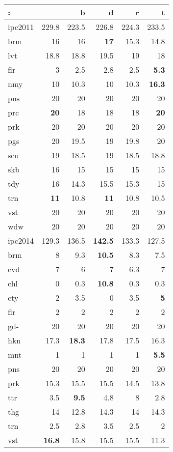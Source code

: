 \begin{center}
\begin{tabular}{lrrrrr}
: &  & b & d & r & t\\
\hline
ipc2011 & 229.8 & 223.5 & 226.8 & 224.3 & 233.5\\
\hline
brm & 16 & 16 & \textbf{17} & 15.3 & 14.8\\
lvt & 18.8 & 18.8 & 19.5 & 19 & 18\\
flr & 3 & 2.5 & 2.8 & 2.5 & \textbf{5.3}\\
nmy & 10 & 10.3 & 10 & 10.3 & \textbf{16.3}\\
pns & 20 & 20 & 20 & 20 & 20\\
prc & \textbf{20} & 18 & 18 & 18 & \textbf{20}\\
prk & 20 & 20 & 20 & 20 & 20\\
pgs & 20 & 19.5 & 19 & 19.8 & 20\\
scn & 19 & 18.5 & 19 & 18.5 & 18.8\\
skb & 16 & 15 & 15 & 15 & 15\\
tdy & 16 & 14.3 & 15.5 & 15.3 & 15\\
trn & \textbf{11} & 10.8 & \textbf{11} & 10.8 & 10.5\\
vst & 20 & 20 & 20 & 20 & 20\\
wdw & 20 & 20 & 20 & 20 & 20\\
\hline
ipc2014 & 129.3 & 136.5 & \textbf{142.5} & 133.3 & 127.5\\
\hline
brm & 8 & 9.3 & \textbf{10.5} & 8.3 & 7.5\\
cvd & 7 & 6 & 7 & 6.3 & 7\\
chl & 0 & 0.3 & \textbf{10.8} & 0.3 & 0.3\\
cty & 2 & 3.5 & 0 & 3.5 & \textbf{5}\\
flr & 2 & 2 & 2 & 2 & 2\\
gd- & 20 & 20 & 20 & 20 & 20\\
hkn & 17.3 & \textbf{18.3} & 17.8 & 17.5 & 16.3\\
mnt & 1 & 1 & 1 & 1 & \textbf{5.5}\\
pns & 20 & 20 & 20 & 20 & 20\\
prk & 15.3 & 15.5 & 15.5 & 14.5 & 13.8\\
ttr & 3.5 & \textbf{9.5} & 4.8 & 8 & 2.8\\
thg & 14 & 12.8 & 14.3 & 14 & 14.3\\
trn & 2.5 & 2.8 & 3.5 & 2.5 & 2\\
vst & \textbf{16.8} & 15.8 & 15.5 & 15.5 & 11.3\\
\end{tabular}
\end{center}


